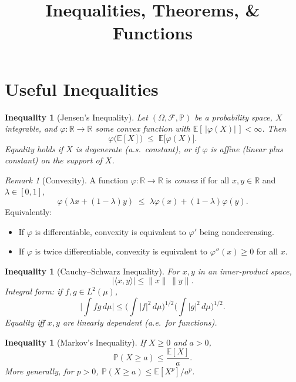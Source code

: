 \documentclass[11pt]{article}
\title{Inequalities, Theorems, \& Functions}
\author{}
\date{}
\theoremstyle{plain}
\newtheorem{inequality}[theorem]{Inequality}
\theoremstyle{definition}
\theoremstyle{remark}
\newtheorem{remark}[theorem]{Remark}
\newcommand{\E}{\mathbb{E}}
\newcommand{\1}{\mathbbm{1}}
\begin{document}
\maketitle
\tableofcontents

\section{Useful Inequalities}

\begin{inequality}[Jensen’s Inequality]
Let $(\Omega,\mathcal{F},\mathbb{P})$ be a probability space, $X$ integrable, and $\varphi:\mathbb{R}\to\mathbb{R}$ some convex function with $\E[\,|\varphi(X)|\,]<\infty$. Then
\[
\varphi\!\big(\E[X]\big) \;\le\; \E\!\big[\varphi(X)\big].
\]
\emph{Equality} holds if $X$ is degenerate (a.s.\ constant), or if $\varphi$ is affine (linear plus constant) on the support of $X$.
\end{inequality}

\begin{remark}[Convexity]
A function $\varphi:\mathbb{R}\to\mathbb{R}$ is \emph{convex} if for all $x,y\in\mathbb{R}$ and $\lambda\in[0,1]$,
\[
\varphi(\lambda x + (1-\lambda)y) \;\le\; \lambda \varphi(x) + (1-\lambda)\varphi(y).
\]
Equivalently:
\begin{itemize}
  \item If $\varphi$ is differentiable, convexity is equivalent to $\varphi'$ being nondecreasing.
  \item If $\varphi$ is twice differentiable, convexity is equivalent to $\varphi''(x)\ge 0$ for all $x$.
\end{itemize}
\end{remark}

\vspace{1em}

\begin{inequality}[Cauchy--Schwarz Inequality]
For $x,y$ in an inner-product space,
\[
|\langle x,y\rangle| \le \|x\|\,\|y\|.
\]
Integral form: if $f,g\in L^2(\mu)$,
\[
\Big|\int fg\,d\mu\Big| \le \big(\int |f|^2\,d\mu\big)^{1/2}\!\big(\int |g|^2\,d\mu\big)^{1/2}.
\]
\emph{Equality} iff $x,y$ are linearly dependent (a.e.\ for functions).
\end{inequality}

\newpage

\begin{inequality}[Markov’s Inequality]
If $X\ge 0$ and $a>0$,
\[
\mathbb{P}(X\ge a) \le \frac{\E[X]}{a}.
\]
More generally, for $p>0$, $\mathbb{P}(X\ge a)\le \E[X^p]/a^p$.
\end{inequality}
\end{document}
